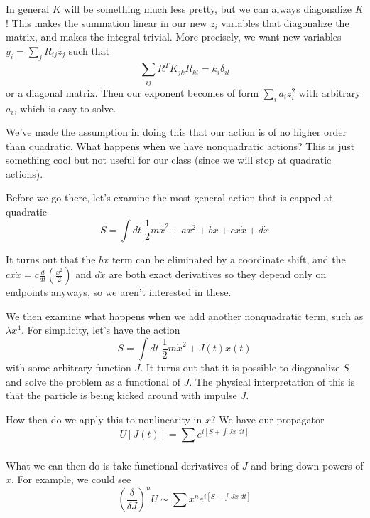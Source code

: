 \documentclass[10pt]{report}
\newcommand{\rd}[2]{\frac{d#1}{d#2}}
\begin{document}
In general $K$ will be something much less pretty, but we can always diagonalize $K$! This makes the summation linear in our new $z_i$ variables that diagonalize the matrix, and makes the integral trivial. More precisely, we want new variables $y_i = \sum_{j}^{}R_{ij}z_j$ such that
\begin{equation}
    \sum_{ij}^{}R^T K_{jk}R_{kl} = k_i \delta_{il}
\end{equation}
or a diagonal matrix. Then our exponent becomes of form $\sum_{i}^{}a_iz_i^2$ with arbitrary $a_i$, which is easy to solve. 

We've made the assumption in doing this that our action is of no higher order than quadratic. What happens when we have nonquadratic actions? This is just something cool but not useful for our class (since we will stop at quadratic actions).

Before we go there, let's examine the most general action that is capped at quadratic
\begin{equation}
    S = \int dt\; \frac{1}{2}m\dot{x}^2 + ax^2 + bx + c x \dot{x} + d\dot{x}
\end{equation}

It turns out that the $bx$ term can be eliminated by a coordinate shift, and the $cx\dot{x} = c\rd{}{t}\left(\frac{x^2}{2}\right)$ and $d\dot{x}$ are both exact derivatives so they depend only on endpoints anyways, so we aren't interested in these.

We then examine what happens when we add another nonquadratic term, such as $\lambda x^4$. For simplicity, let's have the action
\begin{equation}
    S = \int dt\; \frac{1}{2}m\dot{x}^2 + J(t)x(t)
\end{equation}
with some arbitrary function $J$. It turns out that it is possible to diagonalize $S$ and solve the problem as a functional of $J$. The physical interpretation of this is that the particle is being kicked around with impulse $J$. 

How then do we apply this to nonlinearity in $x$? We have our propagator
\begin{equation}
    U[J(t)] = \sum_{}^{}e^{i[S + \int Jx\; dt]}
\end{equation}

What we can then do is take functional derivatives of $J$ and bring down powers of $x$. For example, we could see
\begin{equation}
    \left(\frac{\delta}{\delta J}\right)^nU \sim \sum_{}^{}x^ne^{i[S + \int Jx\; dt]}
\end{equation}
\end{document}
